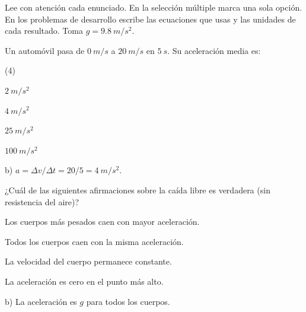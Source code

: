 \documentclass[11pt]{article}
\begin{document}
\encabezado

\begin{instrucciones}
Lee con atención cada enunciado. En la selección múltiple marca una sola
opción. En los problemas de desarrollo escribe las ecuaciones que usas y
las unidades de cada resultado. Toma $g = \qty{9,8}{m/s^2}$.
\end{instrucciones}

\begin{preguntas}

\pregunta[1] Un automóvil pasa de $\qty{0}{m/s}$ a $\qty{20}{m/s}$ en
$\qty{5}{s}$. Su aceleración media es:
\begin{opciones*}(4)
  \item $\qty{2}{m/s^2}$
  \item $\qty{4}{m/s^2}$
  \item $\qty{25}{m/s^2}$
  \item $\qty{100}{m/s^2}$
\end{opciones*}
\begin{solucion}
b) $a = \Delta v / \Delta t = 20/5 = \qty{4}{m/s^2}$.
\end{solucion}

\pregunta[1] ¿Cuál de las siguientes afirmaciones sobre la caída libre es
verdadera (sin resistencia del aire)?
\begin{opciones}
  \item Los cuerpos más pesados caen con mayor aceleración.
  \item Todos los cuerpos caen con la misma aceleración.
  \item La velocidad del cuerpo permanece constante.
  \item La aceleración es cero en el punto más alto.
\end{opciones}
\begin{solucion}
b) La aceleración es $g$ para todos los cuerpos.
\end{solucion}

\end{preguntas}
\end{document}
